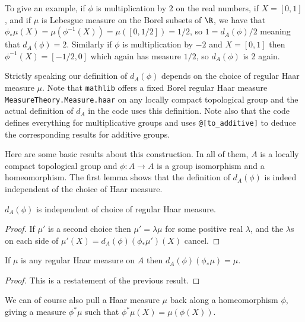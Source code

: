 To give an example, if $\phi$ is multiplication by $2$ on the real numbers,
if $X=[0,1]$, and if $\mu$ is Lebesgue measure on the Borel subsets of $\R$,
we have that $\phi_*\mu(X)=\mu(\phi^{-1}(X))=\mu([0,1/2])=1/2$,
so $1=d_A(\phi)/2$ meaning that $d_A(\phi)=2$. Similarly if $\phi$ is multiplication
by $-2$ and $X=[0,1]$ then $\phi^{-1}(X)=[-1/2,0]$ which again has measure $1/2$,
so $d_A(\phi)$ is 2 again.

Strictly speaking our definition of $d_A(\phi)$ depends on the choice of regular Haar
measure $\mu$. Note that {\tt mathlib} offers a fixed Borel regular Haar measure
{\tt MeasureTheory.Measure.haar} on any locally compact topological group
and the actual definition of $d_A$ in the code uses this definition.
Note also that the code defines everything for multiplicative groups
and uses {\tt @[to\_additive]} to deduce the corresponding results
for additive groups.

Here are some basic results about this construction. In all of them,
$A$ is a locally compact topological group and $\phi:A\to A$ is
a group isomorphism and a homeomorphism. The first lemma shows that
the definition of $d_A(\phi)$ is indeed independent of the choice of Haar measure.

\begin{lemma}
  \label{MeasureTheory.addEquivAddHaarChar_eq}
  \leanok
  $d_A(\phi)$ is independent of choice of regular Haar measure.
\end{lemma}
\begin{proof}
  \leanok
  If $\mu'$ is a second choice then $\mu'=\lambda\mu$ for some
  positive real $\lambda$, and the $\lambda$s on each side of
  $\mu'(X)=d_A(\phi)(\phi_*\mu')(X)$ cancel.
\end{proof}

\begin{lemma}
  \label{MeasureTheory.addEquivAddHaarChar_map}
  \leanok
  If $\mu$ is any regular Haar measure on $A$ then
  $d_A(\phi)(\phi_*\mu) = \mu.$
\end{lemma}
\begin{proof}
  \leanok
  This is a restatement of the previous result.
\end{proof}

We can of course also pull a Haar measure $\mu$ back along a homeomorphism $\phi$,
giving a measure $\phi^*\mu$ such that $\phi^*\mu(X)=\mu(\phi(X))$.

